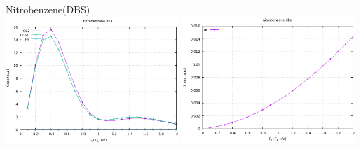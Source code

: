 \vfill
Nitrobenzene(DBS)\\
\includegraphics[width=0.49\textwidth]{chapters/appendix/image/Nitrobenzene1.png}
\includegraphics[width=0.49\textwidth]{chapters/appendix/image/Nitrobenzene2.png}\\
\vfill
